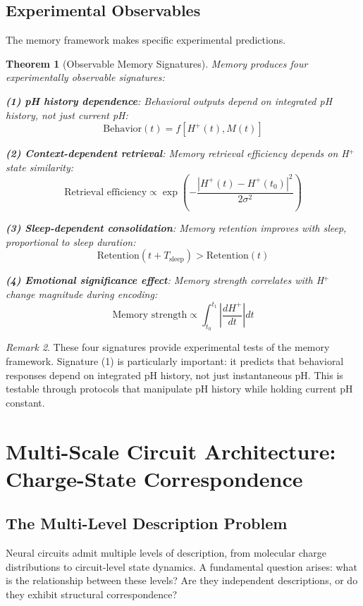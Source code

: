 \documentclass[aps,prd,twocolumn,superscriptaddress,floatfix,nofootinbib]{revtex4-2}
\newtheorem{theorem}{Theorem}[section]
\theoremstyle{remark}
\newtheorem{remark}[theorem]{Remark}
\begin{document}
\subsection{Experimental Observables}

The memory framework makes specific experimental predictions.

\begin{theorem}[Observable Memory Signatures]
\label{thm:memory_observables}
Memory produces four experimentally observable signatures:

\textbf{(1) pH history dependence}: Behavioral outputs depend on integrated pH history, not just current pH:
$$
\text{Behavior}(t) = f[H^+(t), M(t)]
$$

\textbf{(2) Context-dependent retrieval}: Memory retrieval efficiency depends on H$^+$ state similarity:
$$
\text{Retrieval efficiency} \propto \exp\left(-\frac{|H^+(t) - H^+(t_0)|^2}{2\sigma^2}\right)
$$

\textbf{(3) Sleep-dependent consolidation}: Memory retention improves with sleep, proportional to sleep duration:
$$
\text{Retention}(t + T_{\text{sleep}}) > \text{Retention}(t)
$$

\textbf{(4) Emotional significance effect}: Memory strength correlates with H$^+$ change magnitude during encoding:
$$
\text{Memory strength} \propto \int_{t_0}^{t_1} \left|\frac{dH^+}{dt}\right| dt
$$
\end{theorem}

\begin{remark}
These four signatures provide experimental tests of the memory framework. Signature (1) is particularly important: it predicts that behavioral responses depend on integrated pH history, not just instantaneous pH. This is testable through protocols that manipulate pH history while holding current pH constant.
\end{remark}

\section{Multi-Scale Circuit Architecture: Charge-State Correspondence}
\label{sec:isomorphism}

\subsection{The Multi-Level Description Problem}

Neural circuits admit multiple levels of description, from molecular charge distributions to circuit-level state dynamics. A fundamental question arises: what is the relationship between these levels? Are they independent descriptions, or do they exhibit structural correspondence?
\end{document}
